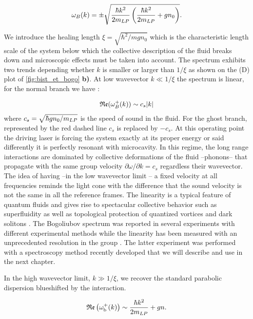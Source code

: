 \begin{equation}
    \omega_B(k) = \pm \sqrt{\dfrac{\hbar k^2}{2m_{LP}} \left({\dfrac{\hbar k^2}{2m_{LP}}} + g n_0 \right)}.
\end{equation}

We introduce the healing length $\xi=\sqrt{\hbar^2/mgn_0}$ which is the characteristic length scale of the system below which the collective description of the fluid breaks down and microscopic effects
must be taken into account. The spectrum exhibits two trends depending whether $k$ is smaller or larger than $1/\xi$ as shown on the (D) plot of \autoref{fig:bist_et_bogo} \textbf{b)}. At low wavevector $k \ll 1/ \xi$ the spectrum is linear, for the normal branch we have :

\begin{equation}
    \mathfrak{Re}(\omega^+_B(k)) \sim c_s\abs{k}
\end{equation}
where $c_s = \sqrt{\hbar g n_0/m_{LP}}$ is the speed of sound in the fluid. For the ghost branch, represented by the red dashed line $c_s$ is replaced by $-c_s$. At this operating point the driving laser is forcing the system exactly at its proper energy or said differently it is perfectly resonant with 
microcavity. In this regime, the long range interactions are dominated by collective deformations of the fluid --phonons-- that propagate with the same group velocity $\partial\omega/\partial k =c_s$ regardless their wavevector. 
The idea of having --in the low wavevector limit -- a fixed velocity at all frequencies reminds the light cone with the difference that the sound velocity is not the same in all the reference frames.
The linearity is a typical feature of quantum fluids and gives rise to spectacular collective behavior such as superfluidity \cite{Amo_fluidlightexp_2009} as well as topological protection of quantized vortices and dark solitons \cite{maitre_thesis}.
The Bogoliubov spectrum was reported in several experiments \cite{utsunomiya_observation_2008,stepanov_dispersion_2019} with different experimental methods while the linearity has been measured with 
an unprecedented resolution in the group \cite{claude_high-resolution_2022}. The latter experiment was performed with a spectroscopy method recently developed \cite{claude_prb} that we will describe and use in the next chapter.

\bigskip

In the high wavevector limit, $k \gg 1/\xi $, we recover the standard parabolic dispersion blueshifted by the interaction.

\begin{equation}
    \mathfrak{Re}\left(\omega_{\mathrm{b}}^+(k)\right) \sim \dfrac{\hbar k^2}{2m_{LP}} + g n.
\end{equation}

